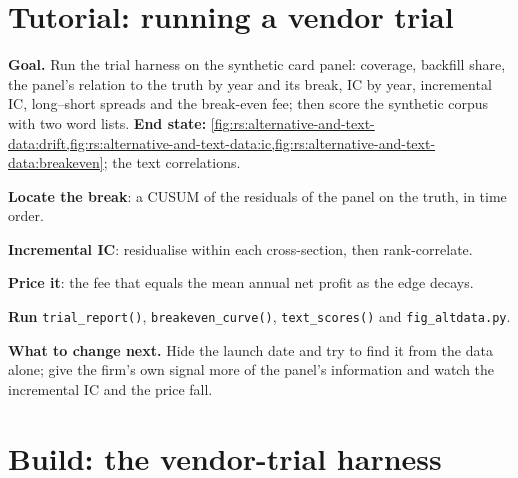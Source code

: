 \section{Tutorial: running a vendor trial}\label{tut:rs:alternative-and-text-data:tut}

\begin{tutorial}
\textbf{Goal.} Run the trial harness on the synthetic card panel: coverage, backfill share, the panel's relation to the truth by year and
its break, IC by year, incremental IC, long--short spreads and the break-even fee; then score the synthetic corpus with two word lists.
\textbf{End state:}
\cref{fig:rs:alternative-and-text-data:drift,fig:rs:alternative-and-text-data:ic,fig:rs:alternative-and-text-data:breakeven}; the text
correlations.
\begin{tutsteps}
\item \textbf{Locate the break}: a CUSUM of the residuals of the panel on the truth, in time order.
\label{lst:rs:alternative-and-text-data:cusum}
\item \textbf{Incremental IC}: residualise within each cross-section, then rank-correlate.
\label{lst:rs:alternative-and-text-data:inc}
\item \textbf{Price it}: the fee that equals the mean annual net profit as the edge decays.
\label{lst:rs:alternative-and-text-data:fee}
\item \textbf{Run} \texttt{trial\_report()}, \texttt{breakeven\_curve()}, \texttt{text\_scores()} and \texttt{fig\_altdata.py}.
\end{tutsteps}
\textbf{What to change next.} Hide the launch date and try to find it from the data alone; give the firm's own signal more of the panel's
information and watch the incremental IC and the price fall.
\end{tutorial}

\section{Build: the vendor-trial harness}\label{bld:rs:alternative-and-text-data:vendoreval}

